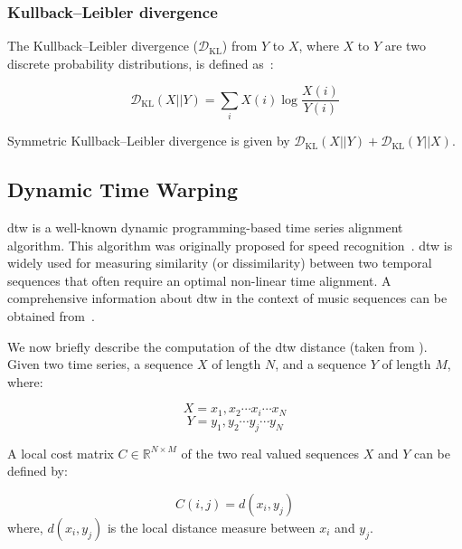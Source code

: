\subsubsection{Kullback–Leibler divergence}
\label{sec:kl_divergence}

The Kullback–Leibler divergence ($\mathcal{D}_\mathrm{KL}$) from $Y$ to $X$, where $X$ to $Y$ are two discrete probability distributions, is defined as~\citep{kullback1951information}:

\begin{equation}
\label{eq:kl_divergence}
\mathcal{D}_\mathrm{KL}(X||Y) = \sum_{i}X(i) \log \frac{X(i)}{Y(i)}
\end{equation}

Symmetric Kullback–Leibler divergence is given by $\mathcal{D}_\mathrm{KL}(X||Y) + \mathcal{D}_\mathrm{KL}(Y||X)$.


\subsection{Dynamic Time Warping}
\label{sec_DTW_distance_measure}

\Acrfull{dtw} is a well-known dynamic programming-based time series alignment algorithm. This algorithm was originally proposed for speed recognition~\citep{Sakoe78TASLP}. \Gls{dtw} is widely used for measuring similarity (or dissimilarity) between two temporal sequences that often require an optimal non-linear time alignment. A comprehensive information about \gls{dtw} in the context of music sequences can be obtained from~\cite{muller2007dynamic}. 

We now briefly describe the computation of the \gls{dtw} distance (taken from \cite{Keogh2004,muller2007dynamic}). Given two time series, a sequence $X$ of length $N$, and a sequence $Y$ of length $M$, where:

\begin{equation}
	X = x_1, x_2 \cdots x_i \cdots x_N
\end{equation}
\begin{equation}
	Y = y_1, y_2 \cdots y_j \cdots y_N
\end{equation}

\noindent A local cost matrix $C \in \mathbb{R}^{N \times M}$ of the two real valued sequences $X$ and $Y$ can be defined by:

\begin{equation}
C(i,j) = d(x_i,y_j)
\end{equation}
\noindent where, $d(x_i,y_j)$ is the local distance measure between $x_i$ and $y_j$.

